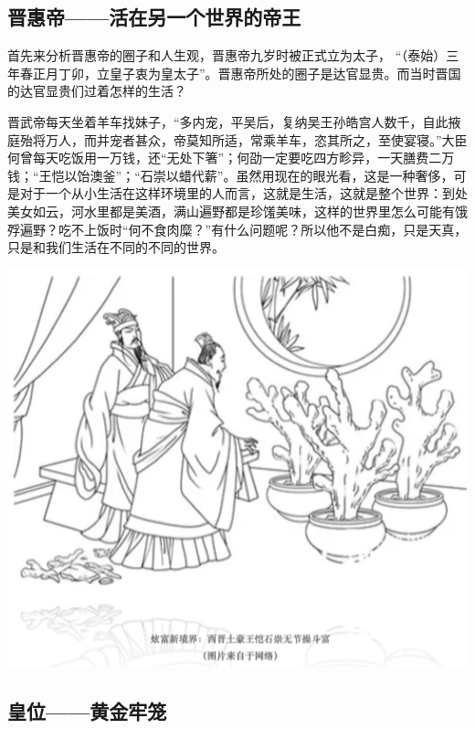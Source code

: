 \documentclass[]{book}
\begin{document}
\hypertarget{ux664bux60e0ux5e1dux6d3bux5728ux53e6ux4e00ux4e2aux4e16ux754cux7684ux5e1dux738b}{%
\subsection{晋惠帝------活在另一个世界的帝王}\label{ux664bux60e0ux5e1dux6d3bux5728ux53e6ux4e00ux4e2aux4e16ux754cux7684ux5e1dux738b}}

首先来分析晋惠帝的圈子和人生观，晋惠帝九岁时被正式立为太子， ``（泰始）三年春正月丁卯，立皇子衷为皇太子''。晋惠帝所处的圈子是达官显贵。而当时晋国的达官显贵们过着怎样的生活？

晋武帝每天坐着羊车找妹子，``多内宠，平吴后，复纳吴王孙皓宫人数千，自此掖庭殆将万人，而并宠者甚众，帝莫知所适，常乘羊车，恣其所之，至使宴寝。''大臣何曾每天吃饭用一万钱，还``无处下箸''；何劭一定要吃四方畛异，一天膳费二万钱；``王恺以饴澳釜''；``石崇以蜡代薪''。虽然用现在的眼光看，这是一种奢侈，可是对于一个从小生活在这样环境里的人而言，这就是生活，这就是整个世界：到处美女如云，河水里都是美酒，满山遍野都是珍馐美味，这样的世界里怎么可能有饿殍遍野？吃不上饭时``何不食肉糜？''有什么问题呢？所以他不是白痴，只是天真，只是和我们生活在不同的不同的世界。

\includegraphics[width=6.67in]{images/his5}

\hypertarget{ux7687ux4f4dux9ec4ux91d1ux7262ux7b3c}{%
\subsection{皇位------黄金牢笼}\label{ux7687ux4f4dux9ec4ux91d1ux7262ux7b3c}}
\end{document}

